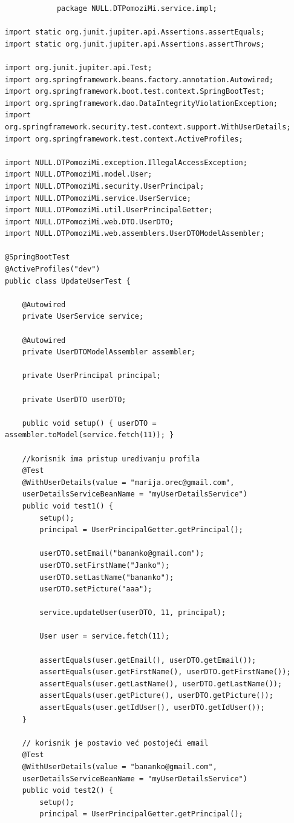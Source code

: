             \begin{verbatim}
			package NULL.DTPomoziMi.service.impl;

import static org.junit.jupiter.api.Assertions.assertEquals;
import static org.junit.jupiter.api.Assertions.assertThrows;

import org.junit.jupiter.api.Test;
import org.springframework.beans.factory.annotation.Autowired;
import org.springframework.boot.test.context.SpringBootTest;
import org.springframework.dao.DataIntegrityViolationException;
import org.springframework.security.test.context.support.WithUserDetails;
import org.springframework.test.context.ActiveProfiles;

import NULL.DTPomoziMi.exception.IllegalAccessException;
import NULL.DTPomoziMi.model.User;
import NULL.DTPomoziMi.security.UserPrincipal;
import NULL.DTPomoziMi.service.UserService;
import NULL.DTPomoziMi.util.UserPrincipalGetter;
import NULL.DTPomoziMi.web.DTO.UserDTO;
import NULL.DTPomoziMi.web.assemblers.UserDTOModelAssembler;

@SpringBootTest
@ActiveProfiles("dev")
public class UpdateUserTest {

	@Autowired
	private UserService service;

	@Autowired
	private UserDTOModelAssembler assembler;

	private UserPrincipal principal;

	private UserDTO userDTO;

	public void setup() { userDTO = assembler.toModel(service.fetch(11)); }

	//korisnik ima pristup uredivanju profila
	@Test
	@WithUserDetails(value = "marija.orec@gmail.com", 
	userDetailsServiceBeanName = "myUserDetailsService")
	public void test1() {
		setup();
		principal = UserPrincipalGetter.getPrincipal();

		userDTO.setEmail("bananko@gmail.com");
		userDTO.setFirstName("Janko");
		userDTO.setLastName("bananko");
		userDTO.setPicture("aaa");

		service.updateUser(userDTO, 11, principal);

		User user = service.fetch(11);

		assertEquals(user.getEmail(), userDTO.getEmail());
		assertEquals(user.getFirstName(), userDTO.getFirstName());
		assertEquals(user.getLastName(), userDTO.getLastName());
		assertEquals(user.getPicture(), userDTO.getPicture());
		assertEquals(user.getIdUser(), userDTO.getIdUser());
	}

	// korisnik je postavio već postojeći email
	@Test
	@WithUserDetails(value = "bananko@gmail.com", 
	userDetailsServiceBeanName = "myUserDetailsService")
	public void test2() {
		setup();
		principal = UserPrincipalGetter.getPrincipal();


\end{verbatim}
